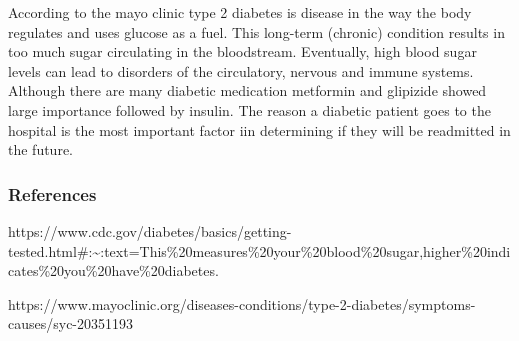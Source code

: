 \documentclass[5p]{elsarticle} %
\begin{document}
According to the mayo clinic type 2 diabetes is disease in the way the
body regulates and uses glucose as a fuel. This long-term (chronic)
condition results in too much sugar circulating in the bloodstream.
Eventually, high blood sugar levels can lead to disorders of the
circulatory, nervous and immune systems. Although there are many
diabetic medication metformin and glipizide showed large importance
followed by insulin. The reason a diabetic patient goes to the hospital
is the most important factor iin determining if they will be readmitted
in the future.

\hypertarget{references}{%
\subsubsection{References}\label{references}}

https://www.cdc.gov/diabetes/basics/getting-tested.html\#:\textasciitilde:text=This\%20measures\%20your\%20blood\%20sugar,higher\%20indicates\%20you\%20have\%20diabetes.

https://www.mayoclinic.org/diseases-conditions/type-2-diabetes/symptoms-causes/syc-20351193
\end{document}

